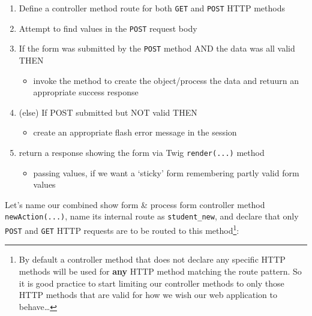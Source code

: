\documentclass[a4paperpaper,openright]{book}
\newenvironment{Shaded}{}{}
\newcommand{\AnnotationTok}[1]{\textcolor[rgb]{0.38,0.63,0.69}{\textbf{\textit{#1}}}}
\newcommand{\CommentTok}[1]{\textcolor[rgb]{0.38,0.63,0.69}{\textit{#1}}}
\newcommand{\KeywordTok}[1]{\textcolor[rgb]{0.00,0.44,0.13}{\textbf{#1}}}
\newcommand{\NormalTok}[1]{#1}
\newcommand{\OtherTok}[1]{\textcolor[rgb]{0.00,0.44,0.13}{#1}}
\providecommand{\tightlist}{%
  \setlength{\itemsep}{0pt}\setlength{\parskip}{0pt}}
\begin{document}
\begin{enumerate}
\def\labelenumi{\arabic{enumi}.}
\item
  Define a controller method route for both \texttt{GET} and
  \texttt{POST} HTTP methods
\item
  Attempt to find values in the \texttt{POST} request body
\item
  If the form was submitted by the \texttt{POST} method AND the data was
  all valid THEN

  \begin{itemize}
  \tightlist
  \item
    invoke the method to create the object/process the data and retuurn
    an appropriate success response
  \end{itemize}
\item
  (else) If POST submitted but NOT valid THEN

  \begin{itemize}
  \tightlist
  \item
    create an appropriate flash error message in the session
  \end{itemize}
\item
  return a response showing the form via Twig \texttt{render(...)}
  method

  \begin{itemize}
  \tightlist
  \item
    passing values, if we want a `sticky' form remembering partly valid
    form values
  \end{itemize}
\end{enumerate}

Let's name our combined show form \& process form controller method
\texttt{newAction(...)}, name its internal route as
\texttt{student\_new}, and declare that only \texttt{POST} and
\texttt{GET} HTTP requests are to be routed to this method\footnote{By
  default a controller method that does not declare any specific HTTP
  methods will be used for \textbf{any} HTTP method matching the route
  pattern. So it is good practice to start limiting our controller
  methods to only those HTTP methods that are valid for how we wish our
  web application to behave\ldots{}}:

\begin{Shaded}
\end{Shaded}
\end{document}
